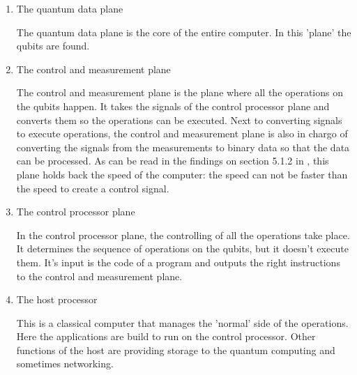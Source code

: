 \begin{enumerate}
    \item The quantum data plane

        \quad The quantum data plane is the core of the entire computer. In this 'plane' the qubits are found.

         
    \item The control and measurement plane

        \quad The control and measurement plane is the plane where all the operations on the qubits happen. It takes the signals of the control processor plane and converts them so the operations can be executed.
        Next to converting signals to execute operations, the control and measurement plane is also in chargo of converting the signals from the measurements to binary data so that the data can be processed. As can be read in the findings on section 5.1.2 in \textcite{qhardware},
        this plane holds back the speed of the computer: the speed can not be faster than the speed to create a control signal.

    \item The control processor plane

        \quad In the control processor plane, the controlling of all the operations take place. It determines the sequence of operations on the qubits, but it doesn't execute them. It's input is the code of a program and outputs the right instructions to the control and measurement plane.

    \item The host processor

        \quad This is a classical computer that manages the 'normal' side of the operations. Here the applications are build to run on the control processor. Other functions of the host are providing storage to the quantum computing and sometimes networking.

\end{enumerate}